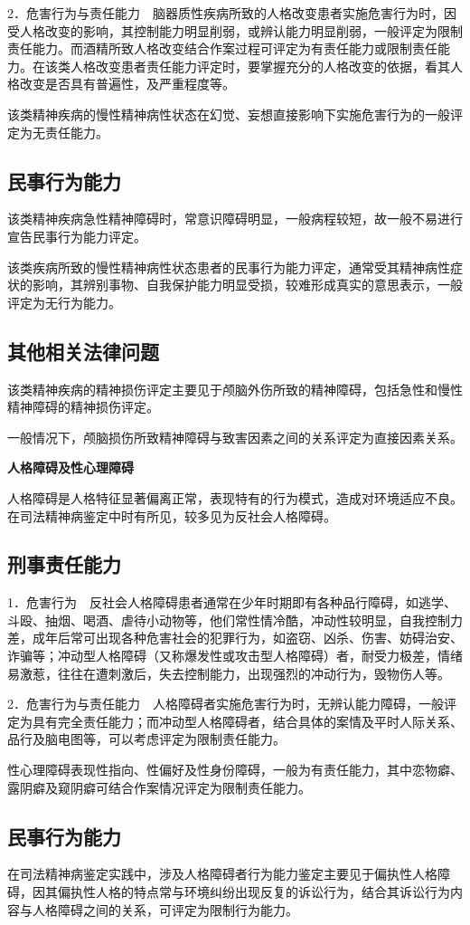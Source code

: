 2．危害行为与责任能力　脑器质性疾病所致的人格改变患者实施危害行为时，因受人格改变的影响，其控制能力明显削弱，或辨认能力明显削弱，一般评定为限制责任能力。而酒精所致人格改变结合作案过程可评定为有责任能力或限制责任能力。在该类人格改变患者责任能力评定时，要掌握充分的人格改变的依据，看其人格改变是否具有普遍性，及严重程度等。

该类精神疾病的慢性精神病性状态在幻觉、妄想直接影响下实施危害行为的一般评定为无责任能力。

\subsection{民事行为能力}

该类精神疾病急性精神障碍时，常意识障碍明显，一般病程较短，故一般不易进行宣告民事行为能力评定。

该类疾病所致的慢性精神病性状态患者的民事行为能力评定，通常受其精神病性症状的影响，其辨别事物、自我保护能力明显受损，较难形成真实的意思表示，一般评定为无行为能力。

\subsection{其他相关法律问题}

该类精神疾病的精神损伤评定主要见于颅脑外伤所致的精神障碍，包括急性和慢性精神障碍的精神损伤评定。

一般情况下，颅脑损伤所致精神障碍与致害因素之间的关系评定为直接因素关系。

\textbf{人格障碍及性心理障碍}

人格障碍是人格特征显著偏离正常，表现特有的行为模式，造成对环境适应不良。在司法精神病鉴定中时有所见，较多见为反社会人格障碍。

\subsection{刑事责任能力}

1．危害行为　反社会人格障碍患者通常在少年时期即有各种品行障碍，如逃学、斗殴、抽烟、喝酒、虐待小动物等，他们常性情冷酷，冲动性较明显，自我控制力差，成年后常可出现各种危害社会的犯罪行为，如盗窃、凶杀、伤害、妨碍治安、诈骗等；冲动型人格障碍（又称爆发性或攻击型人格障碍）者，耐受力极差，情绪易激惹，往往在遭刺激后，失去控制能力，出现强烈的冲动行为，毁物伤人等。

2．危害行为与责任能力　人格障碍者实施危害行为时，无辨认能力障碍，一般评定为具有完全责任能力；而冲动型人格障碍者，结合具体的案情及平时人际关系、品行及脑电图等，可以考虑评定为限制责任能力。

性心理障碍表现性指向、性偏好及性身份障碍，一般为有责任能力，其中恋物癖、露阴癖及窥阴癖可结合作案情况评定为限制责任能力。

\subsection{民事行为能力}

在司法精神病鉴定实践中，涉及人格障碍者行为能力鉴定主要见于偏执性人格障碍，因其偏执性人格的特点常与环境纠纷出现反复的诉讼行为，结合其诉讼行为内容与人格障碍之间的关系，可评定为限制行为能力。